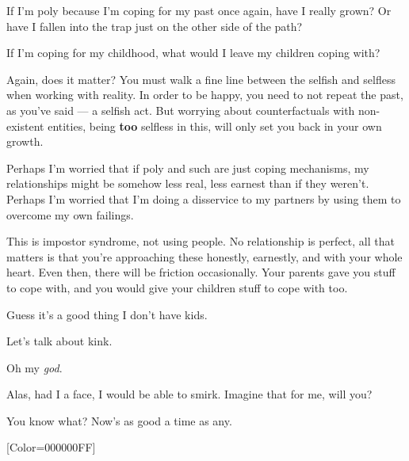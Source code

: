 \begin{paracol}{2}
\begin{leftcolumn}
If I'm poly because I'm coping for my past once again, have I really grown? Or have I fallen into the trap just on the other side of the path?

If I'm coping for my childhood, what would I leave my children coping with?

\begin{ally}
Again, does it matter? You must walk a fine line between the selfish and selfless when working with reality. In order to be happy, you need to not repeat the past, as you've said --- a selfish act. But worrying about counterfactuals with non-existent entities, being \textbf{too} selfless in this, will only set you back in your own growth.
\end{ally}
Perhaps I'm worried that if poly and such are just coping mechanisms, my relationships might be somehow less real, less earnest than if they weren't. Perhaps I'm worried that I'm doing a disservice to my partners by using them to overcome my own failings.

\begin{ally}
This is impostor syndrome, not using people. No relationship is perfect, all that matters is that you're approaching these honestly, earnestly, and with your whole heart. Even then, there will be friction occasionally. Your parents gave you stuff to cope with, and you would give your children stuff to cope with too.
\end{ally}
Guess it's a good thing I don't have kids.

\begin{ally}
Let's talk about kink.
\end{ally}
Oh my \emph{god}.

\begin{ally}
Alas, had I a face, I would be able to smirk. Imagine that for me, will you?
\end{ally}
You know what? Now's as good a time as any.
\newpage

\end{leftcolumn}
\end{paracol}
\resetbackgroundcolor

\renewfontfamily{}[Color=000000FF]
